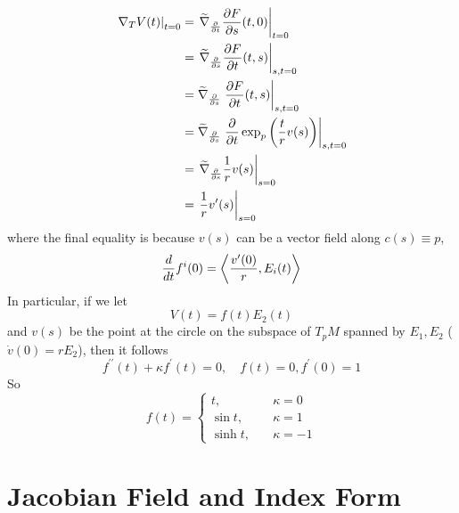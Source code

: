 \begin{enumerate}[label=\Roman{*}.]
	\begin{equation*}
		\begin{aligned}
			\left.\nabla_TV(t)\right\lvert_{t = 0} &= \left.\widetilde{\nabla}_{\frac{\partial}{\partial t}}\frac{\partial F}{\partial s}(t,0) \right\lvert_{t = 0} \\
			&= \left.\widetilde{\nabla}_{\frac{\partial}{\partial s}}\frac{\partial F}{\partial t}(t,s) \right\lvert_{s,t = 0} \\
			&= \widetilde{\nabla}_{\frac{\partial}{\partial s}}\left.\frac{\partial F}{\partial t}(t,s)\right\lvert_{s,t = 0} \\
			&= \widetilde{\nabla}_{\frac{\partial}{\partial s}}\left.\frac{\partial}{\partial t}\exp_p \left(\frac{t}{r}v(s)\right)\right\lvert_{s,t = 0} \\
			&= \left.\widetilde{\nabla}_{\frac{\partial}{\partial s}}\frac{1}{r}v(s)\right\lvert_{s = 0} \\
			&= \left.\frac{1}{r}v^\prime(s)\right\lvert_{s=0}
		\end{aligned}
	\end{equation*}
	where the final equality is because $v(s)$ can be a vector field along $c(s) \equiv p$,
	\begin{equation*}
		\frac{d}{dt}f^i(0) = \left\langle \frac{v^\prime(0)}{r},E_i(t) \right\rangle
	\end{equation*}
	In particular, if we let 
	\begin{equation*}
		V(t) = f(t)E_2(t)
	\end{equation*}
	and $v(s)$ be the point at the circle on the subspace of $T_pM$ spanned by $E_1,E_2$ ($\dot{v}(0) = r E_2$), then it follows
	\begin{equation*}
		f^{\prime\prime}(t) + \kappa f^\prime(t) = 0,\quad f(t) = 0,f^\prime(0) = 1
	\end{equation*}
	So
	\begin{equation*}
		f(t) = \left\{
			\begin{array}{ll}
				t,&\quad \kappa = 0 \\
				\sin t,&\quad \kappa = 1 \\
				\sinh t,&\quad \kappa = -1
			\end{array}
		\right.
	\end{equation*}
\end{enumerate}

\section{Jacobian Field and Index Form}

